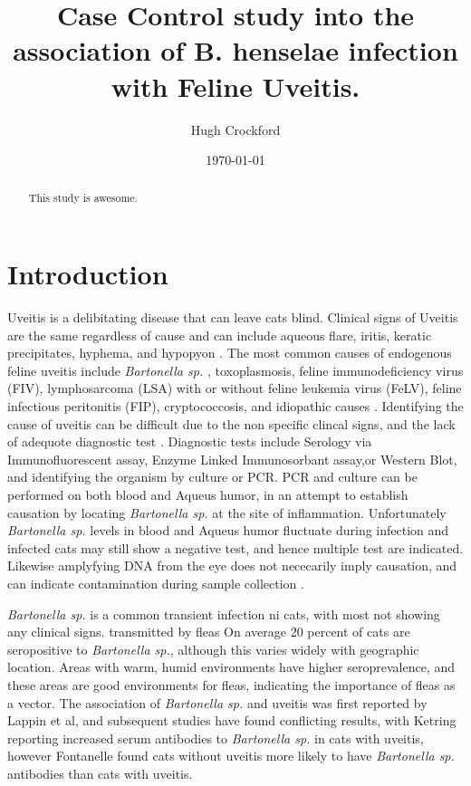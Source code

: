 \documentclass[12pt]{article}
\title{Case Control study into the association of B. henselae infection with Feline Uveitis.}
\author{Hugh Crockford}
\date{\today}
\begin{document}
	\maketitle

\begin{abstract}
	This study is awesome.
\end{abstract}

	\section{Introduction}
		Uveitis is a delibitating disease that can leave cats blind. 
		Clinical signs of Uveitis are the same regardless of cause and can include aqueous flare, iritis, keratic precipitates, hyphema, and hypopyon \cite{Powell2010}.
		The most common causes of endogenous feline uveitis include \emph{Bartonella sp.} , toxoplasmosis, feline immunodeficiency virus (FIV), lymphosarcoma (LSA) with or without feline leukemia virus (FeLV), feline infectious peritonitis (FIP), cryptococcosis, and idiopathic causes \cite{Powell2001}.
		Identifying the cause of uveitis can be difficult due to the non specific clincal signs, and the lack of adequote diagnostic test \cite{Fontenelle2008}.
		Diagnostic tests include Serology via Immunofluorescent assay, Enzyme Linked Immunosorbant assay,or Western Blot, and identifying the organism by culture or PCR.
		PCR and culture can be performed on both blood and Aqueus humor, in an attempt to establish causation by locating \emph{Bartonella sp.} at the site of inflammation. Unfortunately \emph{Bartonella sp.} levels in blood and Aqueus humor fluctuate during infection and infected cats may still show a negative test, and hence multiple test are indicated\cite{Guptill2010}. Likewise amplyfying DNA from the eye does not nececarily imply causation, and can indicate contamination during sample collection \cite{Powell2010}.
		
		\emph{Bartonella sp.} is a common transient infection ni cats, with most not showing any clinical signs. 
		transmitted by fleas
		On average 20 percent of cats are seropositive to \emph{Bartonella sp.}, although this varies widely with geographic location\cite{Jameson1995a}. Areas with warm, humid environments have higher seroprevalence, and these areas are good environments for fleas, indicating the importance of fleas as a vector.
		The association of \emph{Bartonella sp.} and uveitis was first reported by Lappin et al\cite{Lappin1999}, and subsequent studies have found conflicting results, with Ketring reporting increased serum antibodies to \emph{Bartonella sp.} in cats with uveitis\cite{Ketring2004}, however Fontanelle found cats without uveitis more likely to have \emph{Bartonella sp.} antibodies than cats with uveitis.
		
\end{document}
